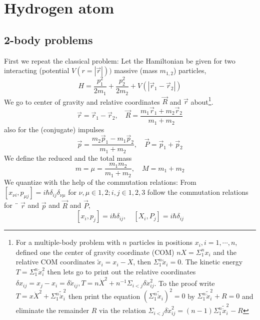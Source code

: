 \section{Hydrogen atom}
\subsection{2-body problems}
First we repeat the classical problem: Let the Hamiltonian be given for two interacting (potential $V (r = | \vec{r} |))$ massive (mass $m_{1,2}$) particles,
\begin{equation}
    H=\frac{p_{1}^{2}}{2 m_{1}}+\frac{p_{2}^{2}}{2 m_{2}}+V\left(\left|\vec{r}_{1}-\vec{r}_{2}\right|\right)
    \end{equation}
We go to center of gravity and relative coordinates $\vec{R}$ and $\vec{r}$ about\footnote{For a multiple-body problem with $n$ particles in positions $x_i, i = 1,\cdots, n$, defined one the center of gravity coordinate (COM) $nX=\Sigma_1^n x_i$ and the relative COM coordinates $\tilde{x}_i = x_i -X$, then $\Sigma_1^n \tilde{x}_i=0$. The kinetic energy $T=\Sigma_1^n\dot{x}^2_i$ then lets go to print out the relative coordinates $\delta x_{ij}=x_j-x_i=\delta\tilde{x}_{ij}, T=n\dot{X}^2+n^{-1}\Sigma_{i<j}\delta\dot{x}_{ij}^2$. To the proof write $T=x\dot{X}^2+\Sigma_1^n \tilde{\dot{x}}_i^2$ then print the equation $(\Sigma_1^n\tilde{\dot{x}}_i)^2=0$ by $\Sigma_1^n\tilde{\dot{x}}_i^2+R=0$ and eliminate the remainder $R$ via the relation $\Sigma_{i<j}\delta\dot{x}_{ij}^2=(n-1)\Sigma_1^n\tilde{\dot{x}}_i^2-R$}.
\begin{equation}
    \vec{r}=\vec{r}_{1}-\vec{r}_{2}, \quad \vec{R}=\frac{m_{1} \vec{r}_{1}+m_{2} \vec{r}_{2}}{m_{1}+m_{2}}
    \end{equation}
also for the (conjugate) impulses
\begin{equation}
    \vec{p}=\frac{m_{2} \vec{p}_{1}-m_{1} \vec{p}_{2}}{m_{1}+m_{2}}, \quad \vec{P}=\vec{p}_{1}+\vec{p}_{2}
    \end{equation}
We define the reduced and the total mass
\begin{equation}
    m=\mu=\frac{m_{1} m_{2}}{m_{1}+m_{2}}, \quad M=m_{1}+m_{2}
    \end{equation}
We quantize with the help of the commutation relations: From $[x_{\nu i},p_{\mu j}]=i\hbar\delta_{ij}\delta_{\nu\mu}$ for $\nu,\mu\in {1, 2}; i, j \in {1, 2, 3}$ follow the commutation relations for ¨ $\vec{r}$ and $\vec{p}$ and $\vec{R}$ and $\vec{P}$,
\begin{equation}
    \left[x_{i}, p_{j}\right]=i \hbar \delta_{i j}, \quad\left[X_{i}, P_{j}\right]=i \hbar \delta_{i j}
    \end{equation}

